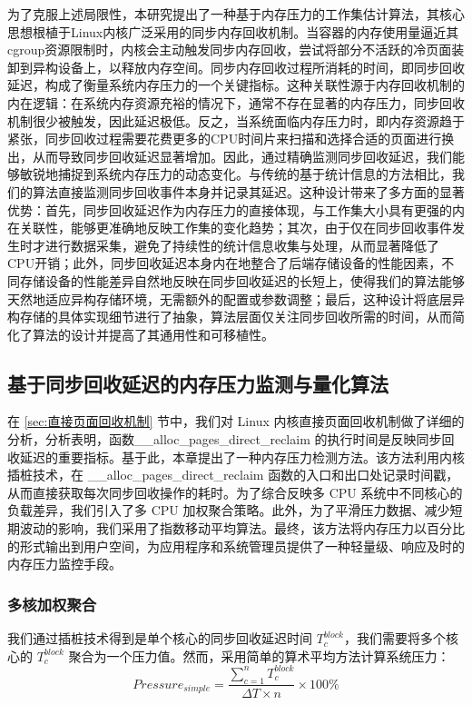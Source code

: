 为了克服上述局限性，本研究提出了一种基于内存压力的工作集估计算法，其核心思想根植于Linux内核广泛采用的同步内存回收机制。当容器的内存使用量逼近其cgroup资源限制时，内核会主动触发同步内存回收，尝试将部分不活跃的冷页面装卸到异构设备上，以释放内存空间。同步内存回收过程所消耗的时间，即同步回收延迟，构成了衡量系统内存压力的一个关键指标。这种关联性源于内存回收机制的内在逻辑：在系统内存资源充裕的情况下，通常不存在显著的内存压力，同步回收机制很少被触发，因此延迟极低。反之，当系统面临内存压力时，即内存资源趋于紧张，同步回收过程需要花费更多的CPU时间片来扫描和选择合适的页面进行换出，从而导致同步回收延迟显著增加。因此，通过精确监测同步回收延迟，我们能够敏锐地捕捉到系统内存压力的动态变化。与传统的基于统计信息的方法相比，我们的算法直接监测同步回收事件本身并记录其延迟。这种设计带来了多方面的显著优势：首先，同步回收延迟作为内存压力的直接体现，与工作集大小具有更强的内在关联性，能够更准确地反映工作集的变化趋势；其次，由于仅在同步回收事件发生时才进行数据采集，避免了持续性的统计信息收集与处理，从而显著降低了CPU开销；此外，同步回收延迟本身内在地整合了后端存储设备的性能因素，不同存储设备的性能差异自然地反映在同步回收延迟的长短上，使得我们的算法能够天然地适应异构存储环境，无需额外的配置或参数调整；最后，这种设计将底层异构存储的具体实现细节进行了抽象，算法层面仅关注同步回收所需的时间，从而简化了算法的设计并提高了其通用性和可移植性。

\subsection{基于同步回收延迟的内存压力监测与量化算法}
\label{sec:基于同步回收延迟的内存压力监测与量化算法}

在 \ref{sec:直接页面回收机制} 节中，我们对 Linux 内核直接页面回收机制做了详细的分析，分析表明，函数\_\_alloc\_pages\_direct\_reclaim 的执行时间是反映同步回收延迟的重要指标。基于此，本章提出了一种内存压力检测方法。该方法利用内核插桩技术，在 \_\_alloc\_pages\_direct\_reclaim 函数的入口和出口处记录时间戳，从而直接获取每次同步回收操作的耗时。为了综合反映多 CPU 系统中不同核心的负载差异，我们引入了多 CPU 加权聚合策略。此外，为了平滑压力数据、减少短期波动的影响，我们采用了指数移动平均算法。最终，该方法将内存压力以百分比的形式输出到用户空间，为应用程序和系统管理员提供了一种轻量级、响应及时的内存压力监控手段。

\subsubsection{多核加权聚合}

我们通过插桩技术得到是单个核心的同步回收延迟时间 \(T_c^{block}\)，我们需要将多个核心的 \(T_c^{block}\) 聚合为一个压力值。然而，采用简单的算术平均方法计算系统压力：
\begin{equation}
    Pressure_{simple} = \frac{\sum_{c=1}^{n} T_c^{block}}{\Delta T \times n} \times 100\%
\end{equation}


